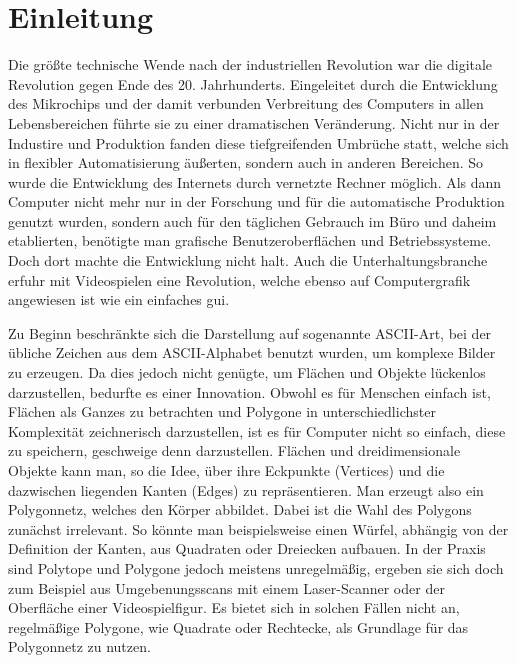 \section{Einleitung}

Die größte technische Wende nach der industriellen Revolution war die digitale Revolution gegen Ende des 20. Jahrhunderts.\cite{digrev}
Eingeleitet durch die Entwicklung des Mikrochips und der damit verbunden Verbreitung des Computers in allen Lebensbereichen führte sie 
zu einer dramatischen Veränderung. Nicht nur in der Industire und Produktion fanden diese tiefgreifenden Umbrüche statt, welche sich in flexibler Automatisierung äußerten,
sondern auch in anderen Bereichen. So wurde die Entwicklung des Internets durch vernetzte Rechner möglich.
Als dann Computer nicht mehr nur in der Forschung und für die automatische Produktion genutzt wurden, sondern auch für den täglichen Gebrauch im Büro und 
daheim etablierten, benötigte man grafische Benutzeroberflächen und Betriebssysteme. Doch dort machte die Entwicklung nicht halt.
Auch die Unterhaltungsbranche erfuhr mit Videospielen eine Revolution, welche ebenso auf Computergrafik angewiesen ist wie ein einfaches \ac{gui}.

Zu Beginn beschränkte sich die Darstellung auf sogenannte ASCII-Art, bei der übliche Zeichen aus dem ASCII-Alphabet benutzt wurden, um komplexe Bilder zu erzeugen.
Da dies jedoch nicht genügte, um Flächen und Objekte lückenlos darzustellen, bedurfte es einer Innovation. Obwohl es für Menschen einfach ist, Flächen als Ganzes zu betrachten und
Polygone in unterschiedlichster Komplexität zeichnerisch darzustellen, ist es für Computer nicht so einfach, diese zu speichern, geschweige denn darzustellen.
Flächen und dreidimensionale Objekte kann man, so die Idee, über ihre Eckpunkte (Vertices) und die dazwischen liegenden Kanten (Edges) zu repräsentieren. 
Man erzeugt also ein Polygonnetz, welches den Körper abbildet. Dabei ist die Wahl des Polygons zunächst irrelevant. So könnte man 
beispielsweise einen Würfel, abhängig von der Definition der Kanten, aus Quadraten oder Dreiecken aufbauen.\cite{polynet}
In der Praxis sind Polytope und Polygone jedoch meistens unregelmäßig, ergeben sie sich doch zum Beispiel aus Umgebenungsscans mit einem Laser-Scanner oder der Oberfläche einer Videospielfigur.
Es bietet sich in solchen Fällen nicht an, regelmäßige Polygone, wie Quadrate oder Rechtecke, als Grundlage für das Polygonnetz zu nutzen.

